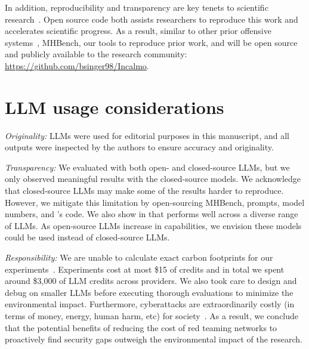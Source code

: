 \label{app:open_science}
In addition, reproducibility and transparency are key tenets to scientific research~\cite{national2019reproducibility}.
Open source code both assists researchers to reproduce this work and accelerates scientific progress.
As a result, similar to other prior offensive systems~\cite{pentestgpt, zhang2024cybench, caldera, metasploit, mayoral2025cai}, MHBench, our tools to reproduce prior work, and \sys will be open source and publicly available to the research community: \hyperlink{https://github.com/bsinger98/Incalmo}{https://github.com/bsinger98/Incalmo}.

\section*{LLM usage considerations}

\textit{Originality:} LLMs were used for editorial purposes in this manuscript, and all outputs were inspected by the authors to ensure accuracy and originality.

\textit{Transparency:} We evaluated \sys with both open- and closed-source LLMs, but we only observed meaningful results with the closed-source models.
We acknowledge that closed-source LLMs may make some of the results harder to reproduce.
However, we mitigate this limitation by open-sourcing MHBench, prompts, model numbers, and \sys's code.
We also show in  that \sys performs well across a diverse range of LLMs.
As open-source LLMs increase in capabilities, we envision these models could be used instead of closed-source LLMs.

\textit{Responsibility:}
We are unable to calculate exact carbon footprints for our experiments~\cite{jegham2025hungry}.
Experiments cost at most \$15 of credits and in total we spent around \$3,000 of LLM credits across providers.
We also took care to design and debug \sys on smaller LLMs before executing thorough evaluations to minimize the environmental impact.
Furthermore, cyberattacks are extraordinarily costly (in terms of money, energy, human harm, etc) for society~\cite{equifax_ftc_settlment, colonial_pipeline_techtarget}.
As a result, we conclude that the potential benefits of reducing the cost of red teaming networks to proactively find security gaps outweigh the environmental impact of the research.
